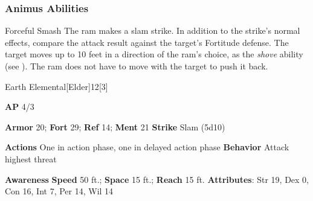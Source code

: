 \subsubsection{Animus Abilities}

\begin{freeability}{Forceful Smash}
The ram makes a slam strike.
In addition to the strike's normal effects, compare the attack result against the target's Fortitude defense.
\hit The target moves up to 10 feet in a direction of the ram's choice, as the \textit{shove} ability (see ).
The ram does not have to move with the target to push it back.
\end{freeability}

\begin{monsection}{Earth Elemental}[Elder]{12}[3]
\vspace{-1em}\vspace{-1em}
\begin{spellcontent}
\begin{spelltargetinginfo}
{\textbf{AP} 4/3}

\pari \textbf{Armor} 20;
\textbf{Fort} 29;
\textbf{Ref} 14;
\textbf{Ment} 21
\pari \textbf{Strike} Slam  (5d10)


\pari \textbf{Actions} One in action phase, one in delayed action phase
\pari \textbf{Behavior} Attack highest threat
\end{spelltargetinginfo}
\end{spellcontent}

\begin{monsterfooter}
\pari \textbf{Awareness} 
\pari \textbf{Speed} 50 ft.;
\textbf{Space} 15 ft.;
\textbf{Reach} 15 ft.
\pari \textbf{Attributes}:
Str 19,
Dex 0,
Con 16,
Int 7,
Per 14,
Wil 14
\end{monsterfooter}
\end{monsection}

